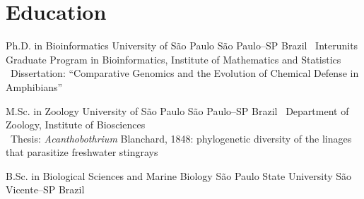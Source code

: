 
\section{Education}

		{Ph.D. in Bioinformatics}
		{University of São Paulo}
		{São Paulo--SP}
		{Brazil}
		{
			\textbullet~Interunits Graduate Program in Bioinformatics, Institute of Mathematics and Statistics\\
			\textbullet~Dissertation: ``Comparative Genomics and the Evolution of Chemical Defense in Amphibians''
		}

		{M.Sc. in Zoology}
		{University of São Paulo}
		{São Paulo--SP}
		{Brazil}
		{
			\textbullet~Department of Zoology, Institute of Biosciences\\
			\textbullet~Thesis: \emph{Acanthobothrium} Blanchard, 1848: phylogenetic diversity of the linages that parasitize freshwater stingrays
		}

		{B.Sc. in Biological Sciences and Marine Biology}
		{São Paulo State University}
		{São Vicente--SP}
		{Brazil}
		{}

